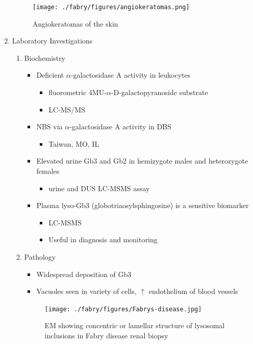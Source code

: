 \documentclass{scrartcl}
\begin{document}
\begin{enumerate}
{\begin{figure}[htbp]
\centering
\texttt{[image: ./fabry/figures/angiokeratomas.png]}
\caption[Angiokeratomas of the skin]{\label{fig:org2b157fc}
Angiokeratomas of the skin}
\end{figure}}



\item Laboratory Investigations
\label{sec:org3941646}

\begin{enumerate}
\item Biochemistry
\label{sec:org14f31ff}
\begin{itemize}
\item Deficient \(\alpha\)-galactosidase A activity in leukocytes
\begin{itemize}
\item fluorometric 4MU-\(\alpha\)-D-galactopyranoside substrate
\item LC-MS/MS
\end{itemize}
\item NBS via \(\alpha\)-galactosidase A activity in DBS
\begin{itemize}
\item Taiwan, MO, IL
\end{itemize}
\item Elevated urine Gb3 and Gb2 in hemizygote males and heterozygote females
\begin{itemize}
\item urine and DUS LC-MSMS assay
\end{itemize}
\item Plasma lyso-Gb3 (globotriaosylsphingosine) is a sensitive biomarker
\begin{itemize}
\item LC-MSMS
\item Useful in diagnosis and monitoring
\end{itemize}
\end{itemize}

\item Pathology
\label{sec:org2da1d2d}

\begin{itemize}
\item Widespread deposition of Gb3
\item Vacuoles seen in variety of cells, \(\uparrow\) endothelium of blood vessels
\end{itemize}

\begin{figure}[htbp]
\centering
\texttt{[image: ./fabry/figures/Fabrys-disease.jpg]}
\caption[Fabry EM]{\label{fig:org5a4ae99}
EM showing concentric or lamellar structure of lysosomal inclusions in Fabry disease renal biopsy}
\end{figure}
\end{enumerate}


\end{enumerate}
\end{document}
